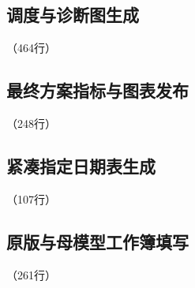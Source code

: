 
\label{code:source:19:end}


\subsection{调度与诊断图生成}

\label{code:source:20}

{\small\noindent{}\quad（464行）\par}


\label{code:source:20:end}


\subsection{最终方案指标与图表发布}

\label{code:source:21}

{\small\noindent{}\quad（248行）\par}


\label{code:source:21:end}


\subsection{紧凑指定日期表生成}

\label{code:source:22}

{\small\noindent{}\quad（107行）\par}


\label{code:source:22:end}


\subsection{原版与母模型工作簿填写}

\label{code:source:23}

{\small\noindent{}\quad（261行）\par}

